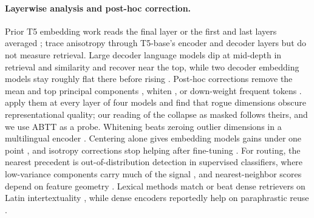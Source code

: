 \paragraph{Layerwise analysis and post-hoc correction.}
Prior T5 embedding work reads the final layer \citep{ni2022sentencet5} or the first and last layers averaged \citep{huang2021whiteningbert}; \citet{godey2024anisotropy} trace anisotropy through T5-base's encoder and decoder layers but do not measure retrieval.
Large decoder language models dip at mid-depth in retrieval and similarity and recover near the top, while two decoder embedding models stay roughly flat there before rising \citep{rizwan2026lexicality}.
Post-hoc corrections remove the mean and top principal components \citep{mu2018allbutthetop}, whiten \citep{su2021whitening}, or down-weight frequent tokens \citep{arora2017sif}.
\citet{timkey2021rogue} apply them at every layer of four models and find that rogue dimensions obscure representational quality; our reading of the collapse as masked follows theirs, and we use ABTT as a probe.
Whitening beats zeroing outlier dimensions in a multilingual encoder \citep{haemmerl2023anisotropy}.
Centering alone gives embedding models gains under one point \citep{ren2026meanbias}, and isotropy corrections stop helping after fine-tuning \citep{rajaee2021finetuning}.
For routing, the nearest precedent is out-of-distribution detection in supervised classifiers, where low-variance components carry much of the signal \citep{kamoi2020mahalanobis, podolskiy2021mahalanobis}, and nearest-neighbor scores depend on feature geometry \citep{sun2022knnood}.
Lexical methods match or beat dense retrievers on Latin intertextuality \citep{schelb2026locisimiles}, while dense encoders reportedly help on paraphrastic reuse \citep{delaselle2026transcription}.
